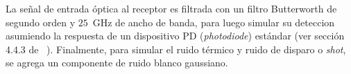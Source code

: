 

La señal de entrada óptica al receptor es filtrada con un filtro Butterworth de segundo orden y $25$~GHz de ancho de banda, para luego simular su deteccion asumiendo la respuesta de un dispositivo PD (\textit{photodiode}) estándar (ver sección 4.4.3 de ~\cite{Agrawal:xx}).
Finalmente, para simular el ruido térmico y ruido de disparo o \textit{shot}, se agrega un componente de ruido blanco gaussiano.


